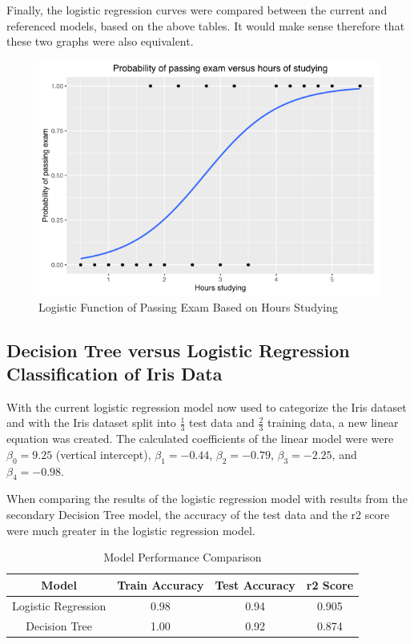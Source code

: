 \documentclass[journal]{IEEEtran}
\begin{document}
Finally, the logistic regression curves were compared between the current and referenced models, based on the above tables. It would make sense therefore that these two graphs were also equivalent.

\begin{figure}[h!]
\includegraphics[scale=0.4]{wikiPassingExams.png}
\centering
\caption{Logistic Function of Passing Exam Based on Hours Studying}
\label{fig:wikilogfunction}
\end{figure}

\subsection{Decision Tree versus Logistic Regression Classification of Iris Data}

With the current logistic regression model now used to categorize the Iris dataset and with the Iris dataset split into \(\frac{1}{3}\) test data and \(\frac{2}{3}\) training data, a new linear equation was created. The calculated coefficients of the linear model were were $\beta_0 = 9.25$ (vertical intercept), $\beta_1 = -0.44$, $\beta_2 = -0.79$, $\beta_3 = -2.25$, and $\beta_4 = -0.98$.

When comparing the results of the logistic regression model with results from the secondary Decision Tree model, the accuracy of the test data and the r2 score were much greater in the logistic regression model. 

\begin{table}[h!]
\centering
\begin{tabular}{ c | c c c }
Model & Train Accuracy & Test Accuracy & r2 Score \\ 
\hline
Logistic Regression	& 0.98	& 0.94	& 0.905 \\
Decision Tree & 	1.00	& 0.92	& 0.874
\end{tabular}
\caption{Model Performance Comparison}
\label{table:model-comparison-table}
\end{table}
\end{document}
